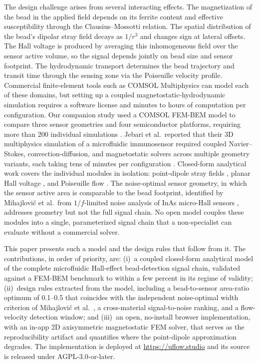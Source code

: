 \documentclass[micromachines,article,submit,pdftex,moreauthors]{Definitions/mdpi}
\begin{document}
The design challenge arises from several interacting effects. The magnetization of
the bead in the applied field depends on its ferrite content and effective
susceptibility through the Clausius--Mossotti relation. The spatial distribution
of the bead's dipolar stray field decays as $1/r^3$ and changes sign at lateral
offsets. The Hall voltage is produced by averaging this inhomogeneous field over
the sensor active volume, so the signal depends jointly on bead size and sensor
footprint. The hydrodynamic transport determines the bead trajectory and transit
time through the sensing zone via the Poiseuille velocity profile. Commercial
finite-element tools such as COMSOL Multiphysics can model each of these domains,
but setting up a coupled magnetostatic-hydrodynamic simulation requires a software
license and minutes to hours of computation per configuration. Our companion study
used a COMSOL FEM-BEM model to compare three sensor geometries and four
semiconductor platforms, requiring more than 200 individual simulations
\cite{govindaraju2025}. Jebari et al.\ reported that their 3D multiphysics
simulation of a microfluidic immunosensor required coupled Navier--Stokes,
convection-diffusion, and magnetostatic solvers across multiple geometry variants,
each taking tens of minutes per configuration \cite{jebari2024}. Closed-form
analytical work covers the individual modules in isolation: point-dipole stray
fields \cite{griffiths}, planar Hall voltage \cite{popovic2004}, and
Poiseuille flow \cite{hewlin2023}. The noise-optimal sensor geometry, in which
the sensor active area is comparable to the bead footprint, identified by
Mihajlovi\'{c} et al.\ from $1/f$-limited noise analysis of InAs micro-Hall
sensors \cite{mihajlovic2007}, addresses geometry but not the full signal chain. No open model couples these modules into a single,
parameterized signal chain that a non-specialist can evaluate without a commercial
solver.

This paper presents such a model and the design rules that follow from it. The
contributions, in order of priority, are: (i)~a coupled closed-form analytical
model of the complete microfluidic Hall-effect bead-detection signal chain,
validated against a FEM-BEM benchmark to within a few percent in its regime of
validity; (ii)~design rules extracted from the model, including a bead-to-sensor
area-ratio optimum of 0.1--0.5 that coincides with the independent noise-optimal
width criterion of Mihajlovi\'{c} et al.\ \cite{mihajlovic2007}, a cross-material
signal-to-noise ranking, and a flow-velocity detection window; and (iii)~an open,
no-install browser implementation, with an in-app 2D axisymmetric magnetostatic
FEM solver, that serves as the reproducibility artifact and quantifies where the
point-dipole approximation degrades. The implementation is deployed at
\url{https://uflow.studio} and its source is released under AGPL-3.0-or-later.
\end{document}
